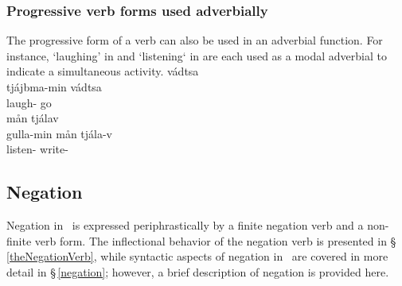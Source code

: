 \subsubsection{Progressive verb forms used adverbially}\label{ADVverbs}
The progressive form of a verb can also be used in an adverbial function. For instance,  ‘laughing’ in  and  ‘listening‘ in  are each used as a modal adverbial to indicate a simultaneous activity. %
\ea\label{ADVverbsEx1}%
\glll	{} vádtsa\\
	tjájbma-min vádtsa\\
	laugh- go\BS{}\\\nopagebreak
{}	
\z
\ea\label{ADVverbsEx2}%
\glll	{} mån tjálav\\
	gulla-min mån tjála-v\\
	listen-  write-\\\nopagebreak
{}	
\z



\subsection{Negation}\label{negationVerb}
Negation in \PS\ is expressed periphrastically by a finite negation verb and a non-finite verb form. The inflectional behavior of the negation verb is presented in §\,\ref{theNegationVerb}, while syntactic aspects of negation in \PS\ are covered in more detail in §\,\ref{negation}; however, a brief description of negation is provided here. 

